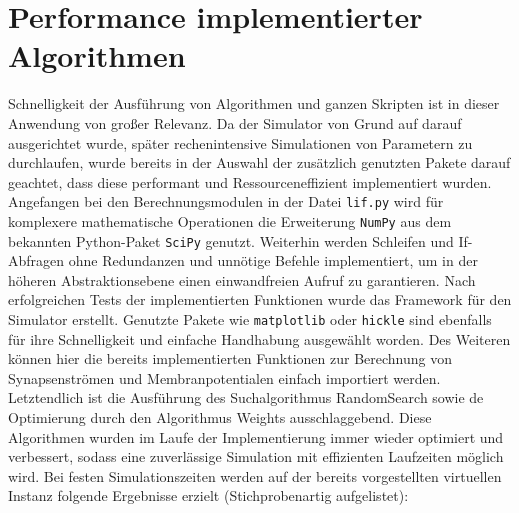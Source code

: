 \section{Performance implementierter Algorithmen}
\label{sec:erg_performance}
	Schnelligkeit der Ausführung von Algorithmen und ganzen Skripten ist in dieser Anwendung von großer Relevanz. Da der Simulator von Grund auf darauf ausgerichtet wurde, später rechenintensive Simulationen von Parametern zu durchlaufen, wurde bereits in der Auswahl der zusätzlich genutzten Pakete darauf geachtet, dass diese performant und Ressourceneffizient implementiert wurden.\\
	Angefangen bei den Berechnungsmodulen in der Datei \texttt{lif.py} wird für komplexere mathematische Operationen die Erweiterung \texttt{NumPy} aus dem bekannten Python-Paket \texttt{SciPy} genutzt. Weiterhin werden Schleifen und If-Abfragen ohne Redundanzen und unnötige Befehle implementiert, um in der höheren Abstraktionsebene einen einwandfreien Aufruf zu garantieren. Nach erfolgreichen Tests der implementierten Funktionen wurde das Framework für den Simulator erstellt. Genutzte Pakete wie \texttt{matplotlib} oder \texttt{hickle} sind ebenfalls für ihre Schnelligkeit und einfache Handhabung ausgewählt worden. Des Weiteren können hier die bereits implementierten Funktionen zur Berechnung von Synapsenströmen und Membranpotentialen einfach importiert werden.\\
	Letztendlich ist die Ausführung des Suchalgorithmus RandomSearch sowie de Optimierung durch den Algorithmus Weights ausschlaggebend. Diese Algorithmen wurden im Laufe der Implementierung immer wieder optimiert und verbessert, sodass eine zuverlässige Simulation mit effizienten Laufzeiten möglich wird. Bei festen Simulationszeiten werden auf der bereits vorgestellten virtuellen Instanz folgende Ergebnisse erzielt (Stichprobenartig aufgelistet):
	\begin{table}[htb]
		\centering
	\caption{Parametersuche durch Algorithmus \texttt{RandomSearch}.}
	\label{tab:sim_rs}
	\end{table}
